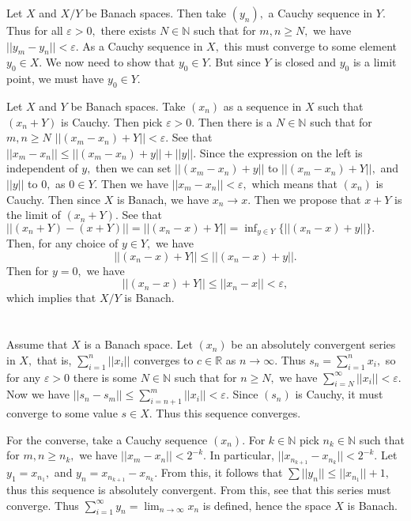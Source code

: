 \documentclass{article}
\begin{document}
Let $X$ and $X/Y$ be Banach spaces. Then take $(y_n),$ a Cauchy sequence in $Y.$ Thus for all $\varepsilon > 0,$ there exists $N \in \mathbb{N}$ such that 
for $m,n \geq N,$ we have $||y_m-y_n||< \varepsilon.$ As a Cauchy sequence in $X,$ this must converge to some element $y_0 \in X.$ We now need to show that 
$y_0 \in Y.$ But since $Y$ is closed and $y_0$ is a limit point, we must have $y_0 \in Y.$

Let $X$ and $Y$ be Banach spaces. Take $(x_n)$ as a sequence in $X$ such that $(x_n+Y)$ is Cauchy. Then pick $\varepsilon>0.$ Then there is a $N \in 
\mathbb{N}$ such that for $m,n \geq N$ $||(x_m-x_n)+Y|| < \varepsilon.$ See that $||x_m-x_n|| \leq ||(x_m-x_n)+y||+||y||.$ Since the expression on the left 
is independent of $y,$ then we can set $||(x_m-x_n)+y||$ to $||(x_m-x_n)+Y||,$ and $||y||$ to $0,$ as $0 \in Y.$ Then we have $||x_m-x_n|| < \varepsilon,$ 
which means that $(x_n)$ is Cauchy. Then since $X$ is Banach, we have $x_n \to x.$ Then we propose that $x + Y$ is the limit of $(x_n+Y).$ See that 
$||(x_n+Y)-(x+Y)|| = || (x_n-x)+Y || = \inf_{y \in Y} \{||(x_n-x)+y|| \}.$ Then, for any choice of $y \in Y,$ we have $$ || (x_n-x)+Y || \leq || (x_n-x)+y 
||.$$ Then for $y=0,$ we have $$|| (x_n-x)+Y || \leq ||x_n-x|| < \varepsilon,$$ which implies that $X/Y$ is Banach. 



\section{} %
Assume that $X$ is a Banach space. Let $(x_n)$ be an absolutely convergent series in $X,$ that is, $\sum_{i=1}^n||x_i||$ converges to $c \in \mathbb{R}$ as 
$n \to \infty.$ Thus  $s_n = \sum_{i=1}^n x_i,$ so for any $\varepsilon>0 $ there is some $N \in \mathbb{N}$ such that for $n \geq N,$ we have 
$\sum_{i=N}^{\infty}||x_i|| < \varepsilon.$
Now we have $||s_n-s_m|| \leq \sum_{i=n+1}^{m} ||x_i|| < \varepsilon.$ Since $(s_n)$ is Cauchy, it must converge to some value $s \in X.$ Thus this sequence 
converges.

For the converse, take a Cauchy sequence $(x_n).$  For $k \in \mathbb{N}$ pick $n_k \in \mathbb{N}$ such that for $m,n \geq n_k,$ we have $ ||x_{m}-x_n ||< 
2^{-k}.$ In particular, $||x_{n_{k+1}}-x_{n_k}||< 2^{-k}.$ Let $y_1=x_{n_1},$ and $y_n= x_{n_{k+1}}-x_{n_{k}}.$ From this, it follows that $\sum ||y_n|| 
\leq ||x_{n_1}||+1,$ thus this sequence is absolutely convergent. From this, see that this series must converge. Thus $ \sum_{i=1}^{\infty}y_n= \lim_{n \to 
\infty} x_n$ is defined, hence the space $X$ is Banach. 
\end{document}
